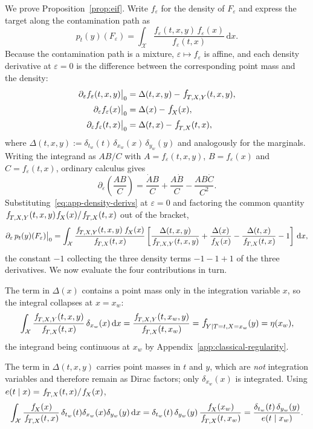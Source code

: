 \documentclass[11pt]{article}
\theoremstyle{plain}
\theoremstyle{definition}
\theoremstyle{remark}
\newcommand{\cX}{\ensuremath{\mathcal{X}}}
\newcommand{\pf}[1]{\ensuremath{\,\mathlarger{\textit{f}}_{#1}}}
\newcommand{\dd}{\,\mathrm{d}}
\newcommand{\gps}{e}
\begin{document}
We prove Proposition~\ref{prop:eif}. Write $f_\varepsilon$ for the density of $F_\varepsilon$
and express the target along the contamination path as
\[
p_t(y)(F_\varepsilon)
= \int_{\cX} \frac{f_\varepsilon(t,x,y)\,f_\varepsilon(x)}{f_\varepsilon(t,x)} \dd x .
\]
Because the contamination path is a mixture, $\varepsilon \mapsto f_\varepsilon$ is affine, and
each density derivative at $\varepsilon = 0$ is the difference between the corresponding point
mass and the density:
\begin{equation}
\begin{aligned}
\partial_\varepsilon f_\varepsilon(t,x,y)\big|_{0} &= \Delta(t,x,y) - \pf{T,X,Y}(t,x,y),\\
\partial_\varepsilon f_\varepsilon(x)\big|_{0} &= \Delta(x) - \pf{X}(x),\\
\partial_\varepsilon f_\varepsilon(t,x)\big|_{0} &= \Delta(t,x) - \pf{T,X}(t,x),
\end{aligned}
\label{eq:app-density-derivs}
\end{equation}
where $\Delta(t,x,y) := \delta_{t_w}(t)\,\delta_{x_w}(x)\,\delta_{y_w}(y)$ and analogously for
the marginals. Writing the integrand as $AB/C$ with $A = f_\varepsilon(t,x,y)$,
$B = f_\varepsilon(x)$ and $C = f_\varepsilon(t,x)$, ordinary calculus gives
\[
\partial_\varepsilon\!\left( \frac{AB}{C} \right)
= \frac{\dot A B}{C} + \frac{A \dot B}{C} - \frac{AB\dot C}{C^2}.
\]
Substituting~\eqref{eq:app-density-derivs} at $\varepsilon = 0$ and factoring the common
quantity $\pf{T,X,Y}(t,x,y)\pf{X}(x)/\pf{T,X}(t,x)$ out of the bracket,
\begin{equation}
\partial_\varepsilon\, p_t(y)(F_\varepsilon)\big|_{0}
= \int_{\cX} \frac{\pf{T,X,Y}(t,x,y)\,\pf{X}(x)}{\pf{T,X}(t,x)}
\left[
\frac{\Delta(t,x,y)}{\pf{T,X,Y}(t,x,y)}
+ \frac{\Delta(x)}{\pf{X}(x)}
- \frac{\Delta(t,x)}{\pf{T,X}(t,x)}
- 1
\right] \dd x ,
\label{eq:app-deriv-general}
\end{equation}
the constant $-1$ collecting the three density terms $-1-1+1$ of the three derivatives. We now
evaluate the four contributions in turn.

The term in $\Delta(x)$ contains a point mass only in the integration variable $x$, so the
integral collapses at $x = x_w$:
\[
\int_{\cX} \frac{\pf{T,X,Y}(t,x,y)}{\pf{T,X}(t,x)}\,\delta_{x_w}(x)\dd x
= \frac{\pf{T,X,Y}(t,x_w,y)}{\pf{T,X}(t,x_w)}
= \pf{Y \mid T=t,X=x_w}(y) = \eta(x_w),
\]
the integrand being continuous at $x_w$ by Appendix~\ref{app:classical-regularity}.

The term in $\Delta(t,x,y)$ carries point masses in $t$ and $y$, which are \emph{not}
integration variables and therefore remain as Dirac factors; only $\delta_{x_w}(x)$ is
integrated. Using $\gps(t \mid x) = \pf{T,X}(t,x)/\pf{X}(x)$,
\[
\int_{\cX} \frac{\pf{X}(x)}{\pf{T,X}(t,x)}\,
\delta_{t_w}(t)\delta_{x_w}(x)\delta_{y_w}(y)\dd x
= \delta_{t_w}(t)\,\delta_{y_w}(y)\,\frac{\pf{X}(x_w)}{\pf{T,X}(t,x_w)}
= \frac{\delta_{t_w}(t)\,\delta_{y_w}(y)}{\gps(t \mid x_w)} .
\]
\end{document}
